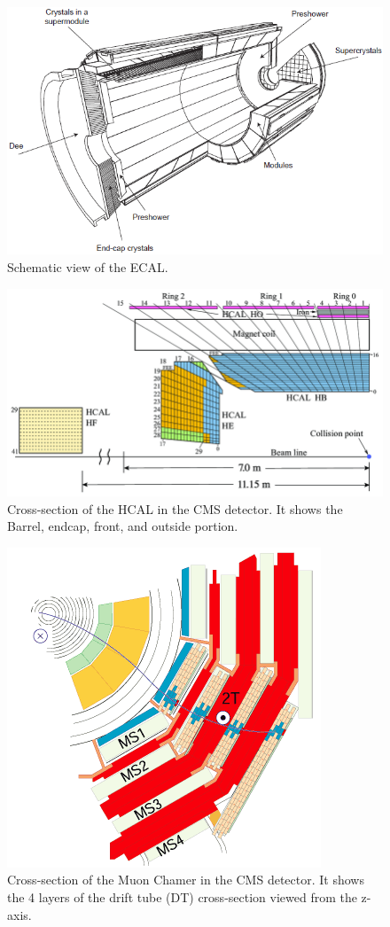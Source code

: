 \begin{figure}[h!]
  \caption{Schematic view of the ECAL. \cite{ecal}}
  \label{fig:ECAL}
  \centering
  \includegraphics[width=0.87\linewidth]{figs/ECAL.png}
\end{figure}

\begin{figure}[h!]
  \caption{Cross-section of the HCAL in the CMS detector. It shows the Barrel, endcap, front, and outside portion. \cite{hcal}}
  \label{fig:HCAL}
  \centering
  \includegraphics[width=0.87\linewidth]{figs/HCAL.png}
\end{figure}

\begin{figure}[h!]
	\caption{Cross-section of the Muon Chamer in the CMS detector. It shows the 4 layers of the drift tube (DT) cross-section viewed from the z-axis. \cite{det}}
  \label{fig:MC}
  \centering
  \includegraphics[width=0.4\linewidth]{figs/MCcms.png}
\end{figure}


